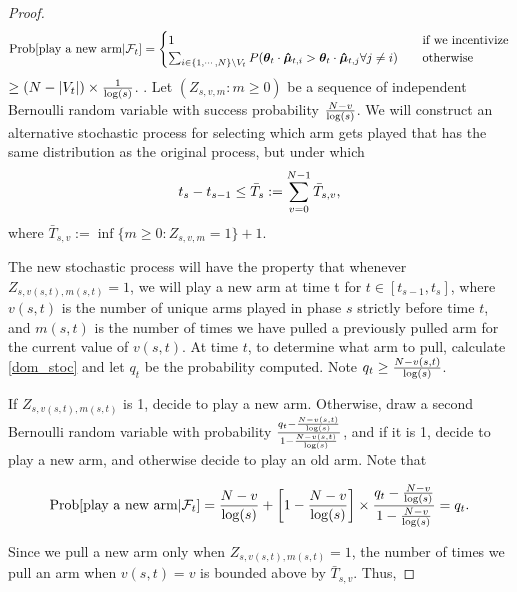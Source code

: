 \begin{proof}
\[ \Prob{\text{play a new arm}|\mathcal{F}_t} =
\begin{cases}
1       & \quad \text{if we incentivize}\\
\sum_{i\in \{1,\cdots,\ARMNUM\}\setminus V_t} P(\AgentV{t} \cdot \ArmEV{t}{i}>\AgentV{t}\cdot \ArmEV{t}{j} \forall j\neq i)  & \quad \text{otherwise}  
\end{cases} \label{dom_stoc}
\] 
\hspace{1cm}$\geq (N-|V_t|)\times \frac{1}{\log(s)}$.
.
Let $(Z_{s,v,m}:m\geq 0)$ be a sequence of independent Bernoulli random variable with success probability $\frac{N-v}{\log(s)}$. We will construct an alternative stochastic process for selecting which arm gets played that has the same distribution as the original process, but under which
\begin{align}
t_{s}-t_{s-1}\leq \bar{T}_{s}:=\sum_{v=0}^{N-1}\bar{T}_{s,v}, \nonumber 
\end{align}
where $\bar{T}_{s,v}:=\inf\{m\geq 0: Z_{s,v,m}=1\}+1$.

The new stochastic process will have the property that whenever $Z_{s,v(s,t),m(s,t)}=1$, we will play a new arm at time t for $t\in [t_{s-1}, t_{s}]$, where $v(s,t)$ is the number of unique arms played in phase $s$ strictly before time $t$, and $m(s,t)$ is the number of times we have pulled a previously pulled arm for the current value of $v(s,t)$. At time $t$, to determine what arm to pull, calculate \eqref{dom_stoc} and let $q_t$ be the probability computed. Note $q_t\geq \frac{N-v(s,t)}{\log(s)}$.

If $Z_{s,v(s,t),m(s,t)}$ is 1, decide to play a new arm. Otherwise, draw a second Bernoulli random variable with probability $\frac{q_t-\frac{N-v(s,t)}{\log(s)}}{1-\frac{N-v(s,t)}{\log(s)}}$, and if it is 1, decide to play a new arm, and otherwise decide to play an old arm. Note that

\begin{align}
\Prob{\text{play a new arm}|\mathcal{F}_{t}}=\frac{\ARMNUM-v}{\log(s)}+\left[1-\frac{\ARMNUM-v}{\log(s)}\right]\times \frac{q_t-\frac{\ARMNUM-v}{\log(s)}}{1-\frac{\ARMNUM-v}{\log(s)}}=q_t.
\end{align}

Since we pull a new arm only when $Z_{s,v(s,t),m(s,t)}=1$, the number of times we pull an arm when $v(s,t)=v$ is bounded above by $\bar{T}_{s,v}$. Thus,


\end{proof}

